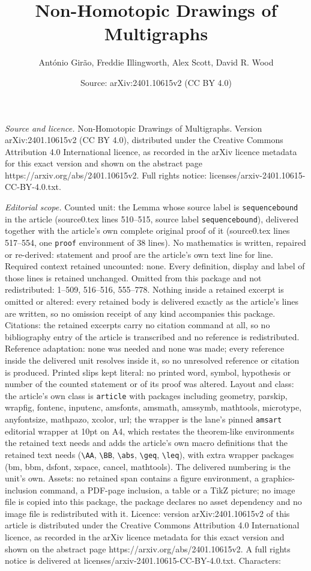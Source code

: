 \documentclass[10pt,a4paper]{amsart}
\title[Non-Homotopic Drawings of Multigraphs]{Non-Homotopic Drawings of Multigraphs}
\author{Ant\'onio Gir\~ao, Freddie Illingworth, Alex Scott, David R. Wood}
\date{Source: arXiv:2401.10615v2 (CC BY 4.0)}
\begin{document}
\maketitle

\noindent\emph{Source and licence.} Non-Homotopic Drawings of Multigraphs. Version arXiv:2401.10615v2 (CC BY 4.0), distributed under the Creative Commons Attribution 4.0 International licence, as recorded in the arXiv licence metadata for this exact version and shown on the abstract page https://arxiv.org/abs/2401.10615v2. Full rights notice: licenses/arxiv-2401.10615-CC-BY-4.0.txt.\par\smallskip

\noindent\textit{Editorial scope.} Counted unit: the Lemma whose source label is \texttt{sequencebound} in the article (source0.tex lines 510--515, source label \texttt{sequencebound}), delivered together with the article's own complete original proof of it (source0.tex lines 517--554, one \texttt{proof} environment of 38 lines). No mathematics is written, repaired or re-derived: statement and proof are the article's own text line for line. Required context retained uncounted: none. Every definition, display and label of those lines is retained unchanged. Omitted from this package and not redistributed: 1--509, 516--516, 555--778. Nothing inside a retained excerpt is omitted or altered: every retained body is delivered exactly as the article's lines are written, so no omission receipt of any kind accompanies this package. Citations: the retained excerpts carry no citation command at all, so no bibliography entry of the article is transcribed and no reference is redistributed. Reference adaptation: none was needed and none was made; every reference inside the delivered unit resolves inside it, so no unresolved reference or citation is produced. Printed slips kept literal: no printed word, symbol, hypothesis or number of the counted statement or of its proof was altered. Layout and class: the article's own class is \texttt{article} with packages including geometry, parskip, wrapfig, fontenc, inputenc, amsfonts, amsmath, amssymb, mathtools, microtype, anyfontsize, mathpazo, xcolor, url; the wrapper is the lane's pinned \texttt{amsart} editorial wrapper at 10pt on A4, which restates the theorem-like environments the retained text needs and adds the article's own macro definitions that the retained text needs (\texttt{\textbackslash AA}, \texttt{\textbackslash BB}, \texttt{\textbackslash abs}, \texttt{\textbackslash geq}, \texttt{\textbackslash leq}), with extra wrapper packages (bm, bbm, dsfont, xspace, cancel, mathtools). The delivered numbering is the unit's own. Assets: no retained span contains a figure environment, a graphics-inclusion command, a PDF-page inclusion, a table or a TikZ picture; no image file is copied into this package, the package declares no asset dependency and no image file is redistributed with it. Licence: version arXiv:2401.10615v2 of this article is distributed under the Creative Commons Attribution 4.0 International licence, as recorded in the arXiv licence metadata for this exact version and shown on the abstract page https://arxiv.org/abs/2401.10615v2. A full rights notice is delivered at licenses/arxiv-2401.10615-CC-BY-4.0.txt. Characters: 
\end{document}
